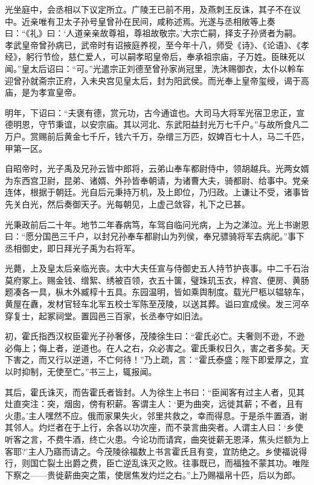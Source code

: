 \documentclass[UTF8,titlepage,oneside]{ctexbook}
\begin{document}
光坐庭中，会丞相以下议定所立。广陵王已前不用，及燕刺王反诛，其子不在议中。近亲唯有卫太子孙号皇曾孙在民间，咸称述焉。光遂与丞相敞等上奏曰：“《礼》曰：‘人道亲亲故尊祖，尊祖故敬宗。’大宗亡嗣，择支子孙贤者为嗣。孝武皇帝曾孙病已，武帝时有诏掖庭养视，至今年十八，师受《诗》、《论语》、《孝经》，躬行节俭，慈仁爱人，可以嗣孝昭皇帝后，奉承祖宗庙，子万姓。臣昧死以闻。”皇太后诏曰：“可。”光遣宗正刘德至曾孙家尚冠里，洗沐赐御衣，太仆以軨车迎曾孙就斋宗正府，入未央宫见皇太后，封为阳武侯。而光奉上皇帝玺绶，谒于高庙，是为孝宣皇帝。


明年，下诏曰：“夫褒有德，赏元功，古今通谊也。大司马大将军光宿卫忠正，宣德明恩，守节秉谊，以安宗庙。其以河北、东武阳益封光万七千户。”与故所食凡二万户。赏赐前后黄金七千斤，钱六千万，杂缯三万匹，奴婢百七十人，马二千匹，甲第一区。


自昭帝时，光子禹及兄孙云皆中郎将，云弟山奉车都尉侍中，领胡越兵。光两女婿为东西宫卫尉，昆弟、诸婿、外孙皆奉朝请，为诸曹大夫，骑都尉、给事中。党亲连体，根据于朝廷。光自后元秉持万机，及上即位，乃归政。上谦让不受，诸事皆先关白光，然后奏御天子。光每朝见，上虚己敛容，礼下之已甚。


光秉政前后二十年。地节二年春病笃，车驾自临问光病，上为之涕泣。光上书谢恩曰：“愿分国邑三千户，以封兄孙奉车都尉山为列侯，奉兄骠骑将军去病祀。”事下丞相御史，即日拜光子禹为右将军。


光薨，上及皇太后亲临光丧。太中大夫任宣与侍御史五人持节护丧事。中二千石治莫府冢上。赐金钱、缯絮、绣被百领，衣五十箧，璧珠玑玉衣，梓宫、便房、黄肠题凑各一具，枞木外臧椁十五具。东园温明，皆如乘舆制度。载光尸柩以辒辌车，黄屋在纛，发材官轻车北军五校士军陈至茂陵，以送其葬。谥曰宣成侯。发三河卒穿复士，起冢祠堂。置园邑三百家，长丞奉守如旧法。


初，霍氏指西汉权臣霍光子孙奢侈，茂陵徐生曰：“霍氏必亡。夫奢则不逊，不逊必侮上；侮上者，逆道也。在人之右，众必害之。霍氏秉权日久，害之者多矣。天下害之，而又行以逆道，不亡何待！”乃上疏，言：“霍氏泰盛；陛下即爱厚之，宜以时抑制，无使至亡。”书三上，辄报闻。


其后，霍氏诛灭，而告霍氏者皆封。人为徐生上书曰：“臣闻客有过主人者，见其灶直突注：突，烟囱，傍有积薪。客谓主人：‘更为曲突，远徙其薪；不者，且有火患。’主人嘿然不应。俄而家果失火，邻里共救之，幸而得息。于是杀牛置酒，谢其邻人。灼烂者在于上行，余各以功次座，而不录言曲突者。人谓主人曰：‘乡使听客之言，不费牛酒，终亡火患。今论功而请宾，曲突徙薪无恩泽，焦头烂额为上客耶?’主人乃寤而请之。今茂陵徐福数上书言霍氏且有变，宜防绝之。乡使福说得行，则国亡裂土出爵之费，臣亡逆乱诛灭之败。往事既已，而福独不蒙其功。唯陛下察之——贵徙薪曲突之策，使居焦发灼烂之右。”上乃赐福帛十匹，后以为郎。
\end{document}
